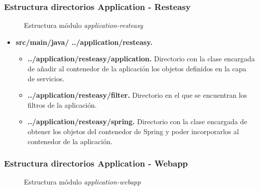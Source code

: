 \subsubsection*{Estructura directorios Application - Resteasy}
\begin{figure}[H]
\centering
{}
\caption{Estructura módulo \textit{application-resteasy}}
\end{figure}

\begin{itemize}
	\item \textbf{src/main/java/ ../application/resteasy. }
	\begin{itemize}
		\item \textbf{../application/resteasy/application. } Directorio con la clase encargada de añadir al contenedor de la aplicación los objetos definidos en la capa de servicios.		
		\item \textbf{../application/resteasy/filter. } Directorio en el que se encuentran los filtros de la aplicación.
		\item \textbf{../application/resteasy/spring. } Directorio con la clase encargada de obtener los objetos del contenedor de Spring y poder incorporarlos al contenedor de la aplicación.
	\end{itemize}
\end{itemize}



\subsubsection*{Estructura directorios Application - Webapp}
\begin{figure}[H]
\centering
{}
\caption{Estructura módulo \textit{application-webapp}}
\end{figure}

